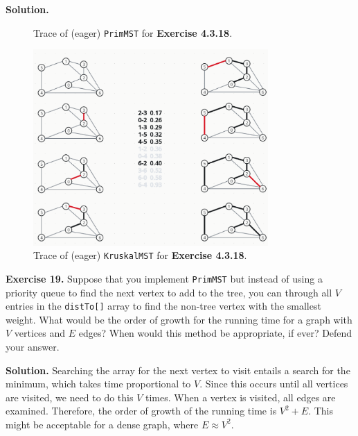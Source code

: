 \documentclass[12pt, a4paper]{article}
\newenvironment{ex}[2][Exercise]
{\par\medskip\noindent \textbf{#1 #2.}}
{\medskip}
\newenvironment{sol}[1][Solution]
{\par\medskip\noindent \textbf{#1.} }
{\medskip}
\begin{document}
\begin{sol}
\begin{figure}
			\caption{Trace of (eager) \texttt{PrimMST} for \textbf{Exercise 4.3.18}.}
			\label{fig:ex-18-eager-prim}
		\end{figure}
		\begin{figure}
			\centering
			\includegraphics[width=0.8\textwidth]{exercise-18-kruskal}
			\caption{Trace of (eager) \texttt{KruskalMST} for \textbf{Exercise 4.3.18}.}
			\label{fig:ex-18-kruskal}
		\end{figure}
	\end{sol}
	\begin{ex}{19}
		Suppose that you implement \texttt{PrimMST} but instead of using a priority queue
		to find the next vertex to add to the tree, you can through all $V$ entries in the
		\texttt{distTo[]} array to find the non-tree vertex with the smallest weight.
		What would be the order of growth for the running time for a graph with $V$ vertices
		and $E$ edges? When would this method be appropriate, if ever? Defend your answer.
	\end{ex}
	\begin{sol}
		Searching the array for the next vertex to visit entails a search for the minimum,
		which takes time proportional to $V$. Since this occurs until all vertices are visited,
		we need to do this $V$ times. When a vertex is visited, all edges are examined.
		Therefore, the order of growth of the running time is $V^2 + E$. This might be
		acceptable for a dense graph, where $E\approx V^2$.
	\end{sol}
	\pagebreak
	\printbibliography
\end{document}
